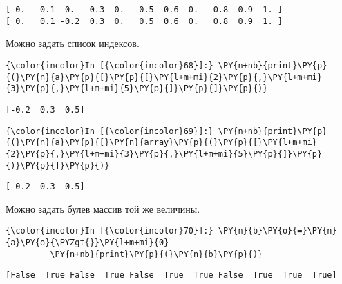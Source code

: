    \begin{Verbatim}[commandchars=\\\{\}]
[ 0.   0.1  0.   0.3  0.   0.5  0.6  0.   0.8  0.9  1. ]
[ 0.   0.1 -0.2  0.3  0.   0.5  0.6  0.   0.8  0.9  1. ]

    \end{Verbatim}

    Можно задать список индексов.

    \begin{Verbatim}[commandchars=\\\{\}]
{\color{incolor}In [{\color{incolor}68}]:} \PY{n+nb}{print}\PY{p}{(}\PY{n}{a}\PY{p}{[}\PY{p}{[}\PY{l+m+mi}{2}\PY{p}{,}\PY{l+m+mi}{3}\PY{p}{,}\PY{l+m+mi}{5}\PY{p}{]}\PY{p}{]}\PY{p}{)}
\end{Verbatim}

    \begin{Verbatim}[commandchars=\\\{\}]
[-0.2  0.3  0.5]

    \end{Verbatim}

    \begin{Verbatim}[commandchars=\\\{\}]
{\color{incolor}In [{\color{incolor}69}]:} \PY{n+nb}{print}\PY{p}{(}\PY{n}{a}\PY{p}{[}\PY{n}{array}\PY{p}{(}\PY{p}{[}\PY{l+m+mi}{2}\PY{p}{,}\PY{l+m+mi}{3}\PY{p}{,}\PY{l+m+mi}{5}\PY{p}{]}\PY{p}{)}\PY{p}{]}\PY{p}{)}
\end{Verbatim}

    \begin{Verbatim}[commandchars=\\\{\}]
[-0.2  0.3  0.5]

    \end{Verbatim}

    Можно задать булев массив той же величины.

    \begin{Verbatim}[commandchars=\\\{\}]
{\color{incolor}In [{\color{incolor}70}]:} \PY{n}{b}\PY{o}{=}\PY{n}{a}\PY{o}{\PYZgt{}}\PY{l+m+mi}{0}
         \PY{n+nb}{print}\PY{p}{(}\PY{n}{b}\PY{p}{)}
\end{Verbatim}

    \begin{Verbatim}[commandchars=\\\{\}]
[False  True False  True False  True  True False  True  True  True]

    \end{Verbatim}

